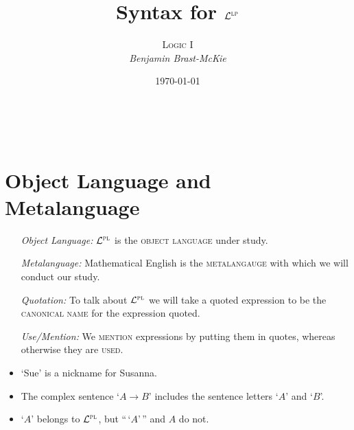 \documentclass[a4paper, 11pt]{article} %
\title{\bf Syntax for $\mathcal{L}^{\textsc{lp}}$} %
\author{\textsc{Logic I}\\ \it Benjamin Brast-McKie} %
\date{\today} %
\makeatletter
\renewcommand{\maketitle}{
\begin{flushright}
{\LARGE\@title}

\vspace{10pt}

{\@author}
\\ \@date
\end{flushright}
}
\makeatother
\begin{document}
\maketitle %

\thispagestyle{empty}






\section*{Object Language and Metalanguage}

\begin{itemize}[leftmargin=1.5in,labelsep=.15in] %
  \item[\it Object Language:] $\mathcal{L}^{\textsc{pl}}$ is the \textsc{object language} under study. %
  \item[\it Metalanguage:] Mathematical English is the \textsc{metalangauge} with which we will conduct our study.
  \item[\it Quotation:] To talk about $\mathcal{L}^{\textsc{pl}}$ we will take a quoted expression to be the \textsc{canonical name} for the expression quoted.
  \item[\it Use/Mention:] We \textsc{mention} expressions by putting them in quotes, whereas otherwise they are \textsc{used}.
  \item `Sue' is a nickname for Susanna.
  \item The complex sentence `$A \rightarrow B$' includes the sentence letters `$A$' and `$B$'.
  \item `$A$' belongs to $\mathcal{L}^{\textsc{pl}}$, but ``\,`$A$'\,'' and $A$ do not. 
\end{itemize}
\end{document}
